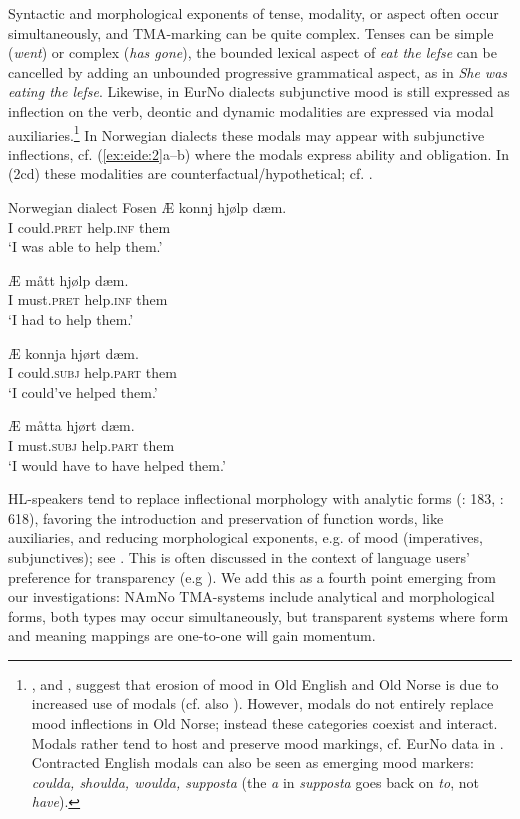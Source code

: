 \documentclass[output=paper]{langscibook}
\begin{document}
Syntactic and morphological exponents of tense, modality, or aspect often occur simultaneously, and TMA-marking can be quite complex. Tenses can be simple (\textit{went}) or complex (\textit{has gone}), the bounded lexical aspect of \textit{eat the lefse} can be cancelled by adding an unbounded progressive grammatical aspect, as in \textit{She was eating the lefse}. Likewise, in EurNo dialects subjunctive mood is still expressed as inflection on the verb, deontic and dynamic modalities are expressed via modal auxiliaries.\footnote{\citet{Roberts1985, Roberts1993}, and \citet{Åfarli1996}, suggest that erosion of mood in Old English and Old Norse is due to increased use of modals (cf. also \citealt{vanKemenadeEtAl2023}). However, modals do not entirely replace mood inflections in Old Norse; instead these categories coexist and interact. Modals rather tend to host and preserve mood markings, cf. EurNo data in \citet[3]{EideDalenJenstad2017}. Contracted English modals can also be seen as emerging mood markers: \textit{coulda, shoulda, woulda, supposta} (the \textit{a} in \textit{supposta} goes back on \textit{to}, not \textit{have}).} In Norwegian dialects these modals may appear with subjunctive inflections, cf. (\ref{ex:eide:2}a--b) where the modals express ability and obligation. In (2cd) these modalities are counterfactual\slash hypothetical; cf. \citet{EideDalenJenstad2017}.

\ea Norwegian dialect Fosen\label{ex:eide:2}
\ea \gll Æ konnj hjølp dæm.\\
    I could.\textsc{pret} help.\textsc{inf} them\\
\glt ‘I was able to help them.’

\ex \gll Æ mått hjølp dæm.\\
		 I must.\textsc{pret} help.\textsc{inf} them\\
\glt ‘I had to help them.’

\ex \gll Æ konnja hjørt dæm.\\
		 I could.\textsc{subj} help.\textsc{part} them\\
\glt ‘I could’ve helped them.’

\ex \gll Æ måtta hjørt dæm.\\
		 I must.\textsc{subj} help.\textsc{part} them\\
\glt     ‘I would have to have helped them.’
\z
\z

HL-speakers tend to replace inflectional morphology with analytic forms (\citealt{Polinsky2018}: 183, \citealt{PutnamEtAl2021}: 618), favoring the introduction and preservation of function words, like auxiliaries, and reducing morphological exponents, e.g. of mood (imperatives, subjunctives); see \citet{Polinsky2018, BenmamounEtAl2013, ScontrasEtAl2015}. This is often discussed in the context of language users’ preference for transparency (e.g \citealt{Polinsky2018, PutnamEtAl2021}). We add this as a fourth point emerging from our investigations: NAmNo TMA-systems include analytical and morphological forms, both types may occur simultaneously, but transparent systems where form and meaning mappings are one-to-one will gain momentum. 
\end{document}
